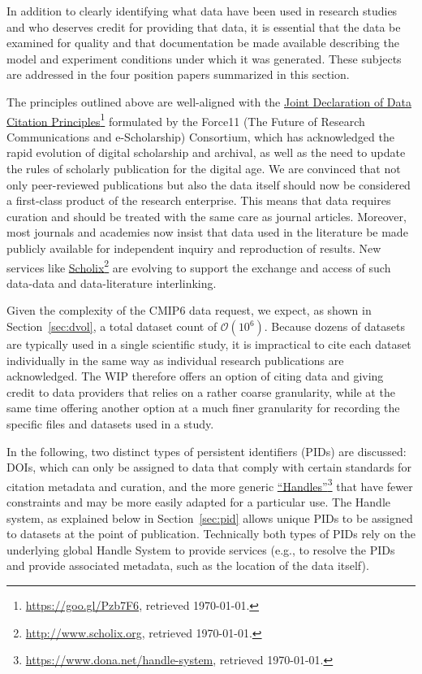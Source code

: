 \documentclass[gmd,manuscript]{copernicus}
\newcommand{\pllabel}[1]{\label{p-#1}\linelabel{l-#1}}
\newcommand{\urlref}[2] {\href{#1}{#2}\footnote{\url{#1}, retrieved \today.}}
\begin{document}
In addition to clearly identifying what data have been used in
research studies and who deserves credit for providing that data, it
is essential that the data be examined for quality and that
documentation be made available describing the model and experiment
conditions under which it was generated. These subjects are addressed
in the four position papers summarized in this section.

The principles outlined above are well-aligned with the
\urlref{https://goo.gl/Pzb7F6}{Joint Declaration of Data Citation
Principles} formulated by the Force11 (The Future of Research
Communications and e-Scholarship) Consortium, which has acknowledged
the rapid evolution of digital scholarship and archival, as well as
the need to update the rules of scholarly publication for the digital
age. We are convinced that not only peer-reviewed publications but
also the data itself should now be considered a first-class product of
the research enterprise. This means that data requires curation and
should be treated with the same care as journal articles. Moreover,
most journals and academies now insist that data used in the
literature be made publicly available for independent inquiry and
reproduction of results. New services like
\urlref{http://www.scholix.org}{Scholix} are evolving to support the
exchange and access of such data-data and data-literature
interlinking.

Given the complexity of the CMIP6 data request, we expect, as shown in
Section~\ref{sec:dvol}, a total dataset count of $\mathcal{O}(10^6)$.
Because dozens of datasets are typically used in a single scientific
study, it is impractical to cite each dataset individually in the same
way as individual research publications are acknowledged. The WIP
therefore offers an option of citing data and giving credit to data
providers that relies on a rather coarse granularity, while at the
same time offering another option at a much finer granularity for
recording the specific files and datasets used in a study.

In the following, two distinct types of persistent identifiers (PIDs)
are discussed: DOIs, which can only be assigned to data that comply
with certain standards for citation metadata and curation, and the
more generic
\pllabel{RC1-37}
\urlref{https://www.dona.net/handle-system}{``Handles''} that have
fewer constraints and may be more easily adapted for a particular use.
\pllabel{RC2-31}
The Handle system, as explained below in Section~\ref{sec:pid} allows
unique PIDs to be assigned to datasets at the point of publication.
Technically both types of PIDs rely on the underlying global Handle
System to provide services (e.g., to resolve the PIDs and provide
associated metadata, such as the location of the data itself).
\end{document}
